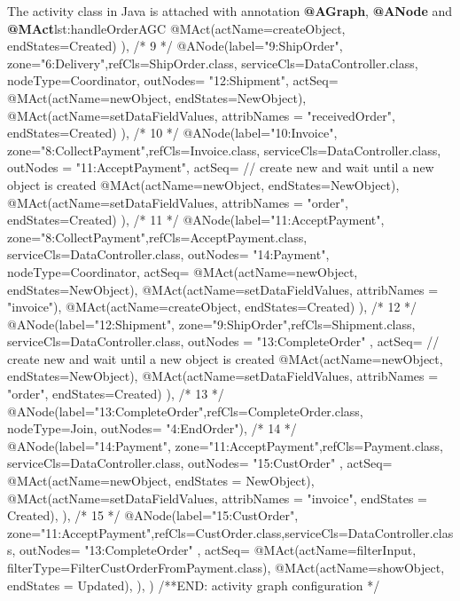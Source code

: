 \begin{lstcodeplainssm}{The activity class  in Java is attached with annotation \textbf{@AGraph}, \textbf{@ANode} and \textbf{@MAct}}{lst:handleOrderAGC}
{{		@MAct(actName=createObject, endStates={Created})
	}),
	/* 9 */    
	@ANode(label="9:ShipOrder", zone="6:Delivery",refCls=ShipOrder.class, serviceCls=DataController.class,
	nodeType=Coordinator,
	outNodes= {"12:Shipment"},
	actSeq={
		@MAct(actName=newObject, endStates={NewObject}),
		@MAct(actName=setDataFieldValues, attribNames = {"receivedOrder"}, endStates={Created})
	}),
	/* 10 */    
	@ANode(label="10:Invoice", zone="8:CollectPayment",refCls=Invoice.class, serviceCls=DataController.class, 
	outNodes = {"11:AcceptPayment"},
	actSeq={
		// create new and wait until a new object is created
		@MAct(actName=newObject, endStates={NewObject}),
		@MAct(actName=setDataFieldValues, attribNames = {"order"}, endStates={Created})
	}),
	/* 11 */    
	@ANode(label="11:AcceptPayment", zone="8:CollectPayment",refCls=AcceptPayment.class, serviceCls=DataController.class,
	outNodes= {"14:Payment"},
	nodeType=Coordinator,      
	actSeq={
		@MAct(actName=newObject, endStates={NewObject}),
		@MAct(actName=setDataFieldValues, attribNames = {"invoice"}),
		@MAct(actName=createObject, endStates={Created})
	}),
	/* 12 */    
	@ANode(label="12:Shipment", zone="9:ShipOrder",refCls=Shipment.class, serviceCls=DataController.class,
	outNodes = { "13:CompleteOrder" },
	actSeq={
		// create new and wait until a new object is created
		@MAct(actName=newObject, endStates={NewObject}),
		@MAct(actName=setDataFieldValues, attribNames = {"order"}, endStates={Created})
	}),
	/* 13 */    
	@ANode(label="13:CompleteOrder",refCls=CompleteOrder.class, nodeType=Join, 
	outNodes= {"4:EndOrder"}),
	/* 14 */    
	@ANode(label="14:Payment", zone="11:AcceptPayment",refCls=Payment.class, serviceCls=DataController.class, 
	outNodes= { "15:CustOrder" },
	actSeq={
		@MAct(actName=newObject, endStates = {NewObject}),
		@MAct(actName=setDataFieldValues, attribNames = {"invoice"}, endStates = {Created}),
	}),
	/* 15 */    
	@ANode(label="15:CustOrder", zone="11:AcceptPayment",refCls=CustOrder.class,serviceCls=DataController.class,
	outNodes= { "13:CompleteOrder" },
	actSeq={
		@MAct(actName=filterInput, filterType=FilterCustOrderFromPayment.class),
		@MAct(actName=showObject, endStates = {Updated}),
	}),
})
/**END: activity graph configuration */
%
%
\end{lstcodeplainssm}
